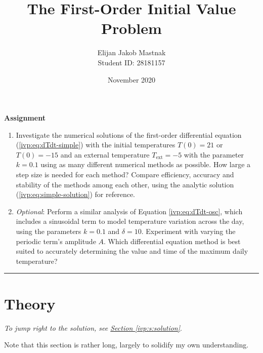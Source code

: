 \documentclass[11pt, a4paper]{article}
\begin{document}
\title{The First-Order Initial Value Problem}
\author{Elijan Jakob Mastnak\\[1mm]\small{Student ID: 28181157}}
\date{November 2020}
\maketitle

\tableofcontents

\newpage
\begin{center}
\textbf{Assignment}
\begin{enumerate}
	\item Investigate the numerical solutions of the first-order differential equation (\ref{ivp:eq:dTdt-simple}) with the initial temperatures $ T(0) = 21 $ or $ T(0) = -15 $ and an external temperature $ T_{\text{ext}} = -5 $ with the parameter $ k = 0.1 $ using as many different numerical methods as possible. How large a step size is needed for each method? Compare efficiency, accuracy and stability of the methods among each other, using the analytic solution (\ref{ivp:eq:simple-solution}) for reference. 
	
	
	\item \textit{Optional}: Perform a similar analysis of Equation \ref{ivp:eq:dTdt-osc}, which includes a sinusoidal term to model temperature variation across the day, using the parameters $ k = 0.1 $ and $ \delta = 10 $. Experiment with varying the periodic term's amplitude $ A $. Which differential equation method is best suited to accurately determining the value and time of the maximum daily temperature? 
\end{enumerate}
\end{center}

\vspace{2mm}

\rule{\textwidth}{0.2pt}

\section{Theory} \label{ivp:s:theory}
\vspace{-2mm}
\textit{To jump right to the solution, see \hyperref[ivp:s:solution]{Section \ref{ivp:s:solution}}}.

Note that this section is rather long, largely to solidify my own understanding.
\end{document}

